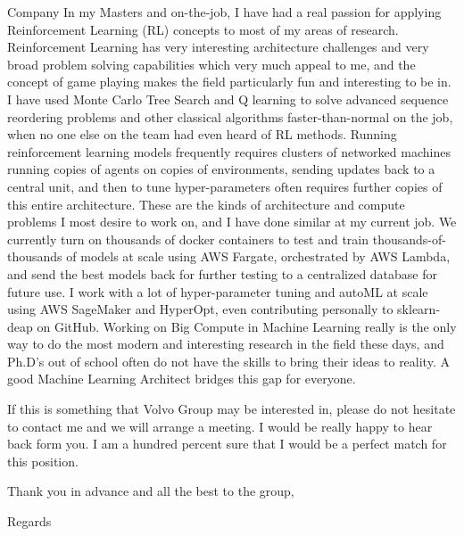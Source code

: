 \documentclass[]{letter}
\begin{document}
\begin{letter}{Company}
    In my Masters and on-the-job, I have had a real passion for applying Reinforcement Learning (RL) concepts to most of my areas of research. Reinforcement Learning has very interesting architecture challenges and very broad problem solving capabilities which very much appeal to me, and the concept of game playing makes the field particularly fun and interesting to be in. I have used Monte Carlo Tree Search and Q learning to solve advanced sequence reordering problems and other classical algorithms faster-than-normal on the job, when no one else on the team had even heard of RL methods. Running reinforcement learning models frequently requires clusters of networked machines running copies of agents on copies of environments, sending updates back to a central unit, and then to tune hyper-parameters often requires further copies of this entire architecture. These are the kinds of architecture and compute problems I most desire to work on, and I have done similar at my current job. We currently turn on thousands of docker containers to test and train thousands-of-thousands of models at scale using AWS Fargate, orchestrated by AWS Lambda, and send the best models back for further testing to a centralized database for future use. I work with a lot of hyper-parameter tuning and autoML at scale using AWS SageMaker and HyperOpt, even contributing personally to sklearn-deap on GitHub. Working on Big Compute in Machine Learning really is the only way to do the most modern and interesting research in the field these days, and Ph.D's out of school often do not have the skills to bring their ideas to reality. A good Machine Learning Architect bridges this gap for everyone.
    
    If this is something that Volvo Group may be interested in, please do not hesitate to contact me and we will arrange a meeting. I would be really happy to hear back form you. I am a hundred percent sure that I would be a perfect match for this position.

    Thank you in advance and all the best to the group,
    
    \closing{Regards}
    \signature{Ryan Peach}

\end{letter}
\end{document}
